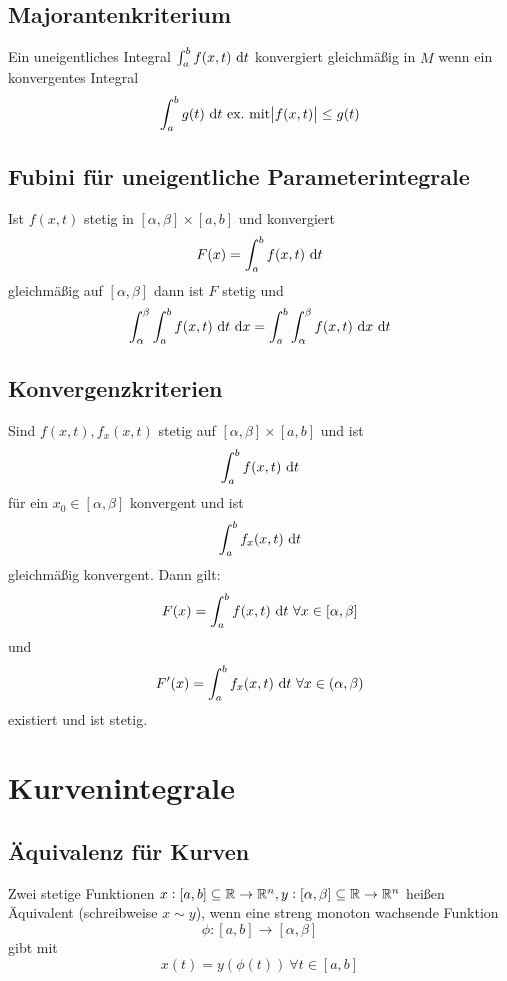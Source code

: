 \subsection{Majorantenkriterium}
Ein uneigentliches Integral $\int_a^b f(x,t) \text{ d}t$ konvergiert gleichmäßig in $M$ wenn ein konvergentes
Integral
\begin{equation*}
    \int_a^b g(t) \text{ d}t \text{ ex.\ mit} \abs{f(x,t)} \leq g(t)
\end{equation*}

\subsection{Fubini für uneigentliche Parameterintegrale}
Ist $f(x,t)$ stetig in $[\alpha, \beta] \times [a,b]$ und konvergiert
\begin{equation*}
    F(x) = \int_a^b f(x,t) \text{ d}t
\end{equation*}
gleichmäßig auf $[\alpha, \beta]$ dann ist $F$ stetig und
\begin{equation*}
    \int_\alpha^\beta \int_a^b f(x,t) \text{ d}t \text{ d}x =
    \int_a^b \int_\alpha^\beta f(x,t) \text{ d}x \text{ d}t
\end{equation*}

\subsection{Konvergenzkriterien}
Sind $f(x,t), f_x(x,t)$ stetig auf $[\alpha, \beta] \times [a,b]$ und ist
\begin{equation*}
    \int_a^b f(x, t) \text{ d}t
\end{equation*}
für ein $x_0 \in [\alpha, \beta]$ konvergent und ist
\begin{equation*}
    \int_a^b f_x(x,t) \text{ d}t
\end{equation*}
gleichmäßig konvergent. Dann gilt:
\begin{equation*}
    F(x) = \int_a^b f(x,t) \text{ d}t\ \forall x \in [\alpha, \beta]
\end{equation*}
und
\begin{equation*}
    F'(x) = \int_a^b f_x(x,t) \text{ d}t\ \forall x \in (\alpha, \beta)
\end{equation*}
existiert und ist stetig.

\section{Kurvenintegrale}
\subsection{Äquivalenz für Kurven}
Zwei stetige Funktionen $x: [a, b] \subseteq \mathbb{R} \rightarrow \mathbb{R}^n, y:[\alpha, \beta]
\subseteq \mathbb{R} \rightarrow \mathbb{R}^n$ heißen Äquivalent (schreibweise $x \sim y$), wenn eine
streng monoton wachsende Funktion
\begin{equation*}
    \phi: [a,b] \rightarrow [\alpha, \beta]
\end{equation*}
gibt mit
\begin{equation*}
    x(t) = y(\phi(t))\ \forall t \in [a,b]
\end{equation*}

